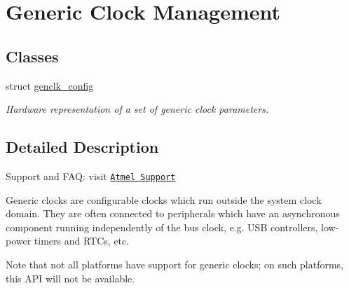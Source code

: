 \hypertarget{group__genclk__group}{\section{Generic Clock Management}
\label{group__genclk__group}
}
\subsection*{Classes}
\begin{DoxyCompactItemize}
\item 
struct \hyperlink{structgenclk__config}{genclk\-\_\-config}
\begin{DoxyCompactList}\small\item\em Hardware representation of a set of generic clock parameters. \end{DoxyCompactList}\end{DoxyCompactItemize}


\subsection{Detailed Description}
Support and F\-A\-Q\-: visit \href{http://www.atmel.com/design-support/}{\tt Atmel Support}

Generic clocks are configurable clocks which run outside the system clock domain. They are often connected to peripherals which have an asynchronous component running independently of the bus clock, e.\-g. U\-S\-B controllers, low-\/power timers and R\-T\-Cs, etc.

Note that not all platforms have support for generic clocks; on such platforms, this A\-P\-I will not be available. 